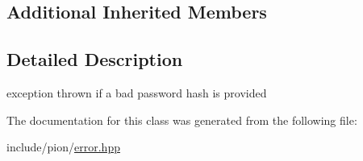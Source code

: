 \subsection*{Additional Inherited Members}


\subsection{Detailed Description}
exception thrown if a bad password hash is provided 

The documentation for this class was generated from the following file\-:\begin{DoxyCompactItemize}
\item 
include/pion/\hyperlink{error_8hpp}{error.\-hpp}\end{DoxyCompactItemize}
